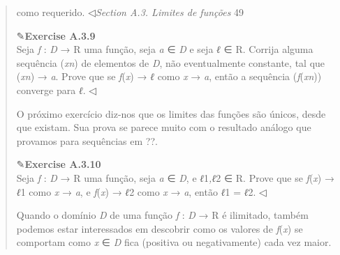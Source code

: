 \documentclass[
]{article}
\begin{document}
\begin{quote}
como requerido. ◁\emph{Section A.3. Limites de funções} 49

✎\textbf{Exercise A.3.9}\\
Seja \emph{f} : \emph{D} → R uma função, seja \emph{a} ∈ \emph{D} e seja
\emph{ℓ} ∈ R. Corrija alguma sequência (\emph{xn}) de elementos de
\emph{D}, não eventualmente constante, tal que (\emph{xn}) → \emph{a}.
Prove que se \emph{f}(\emph{x}) → \emph{ℓ} como \emph{x} → \emph{a},
então a sequência (\emph{f}(\emph{xn})) converge para \emph{ℓ}. ◁

O próximo exercício diz-nos que os limites das funções são únicos, desde
que existam. Sua prova se parece muito com o resultado análogo que
provamos para sequências em ??.

✎\textbf{Exercise A.3.10}\\
Seja \emph{f} : \emph{D} → R uma função, seja \emph{a} ∈ \emph{D}, e
\emph{ℓ}1\emph{,ℓ}2 ∈ R. Prove que se \emph{f}(\emph{x}) → \emph{ℓ}1
como \emph{x} → \emph{a}, e \emph{f}(\emph{x}) → \emph{ℓ}2 como \emph{x}
→ \emph{a}, então \emph{ℓ}1 = \emph{ℓ}2. ◁

Quando o domínio \emph{D} de uma função \emph{f} : \emph{D} → R é
ilimitado, também podemos estar interessados em descobrir como os
valores de \emph{f}(\emph{x}) se comportam como \emph{x} ∈ \emph{D} fica
(positiva ou negativamente) cada vez maior.
\end{quote}
\end{document}
